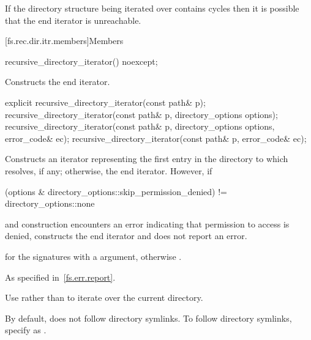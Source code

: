 \pnum
\begin{note}
If the directory structure being iterated over contains cycles
then it is possible that the end iterator is unreachable.
\end{note}

[fs.rec.dir.itr.members]{Members}

%
\begin{itemdecl}
recursive_directory_iterator() noexcept;
\end{itemdecl}

\begin{itemdescr}
\pnum
\effects
Constructs the end iterator.
\end{itemdescr}

%
\begin{itemdecl}
explicit recursive_directory_iterator(const path& p);
recursive_directory_iterator(const path& p, directory_options options);
recursive_directory_iterator(const path& p, directory_options options, error_code& ec);
recursive_directory_iterator(const path& p, error_code& ec);
\end{itemdecl}

\begin{itemdescr}
\pnum
\effects
Constructs an iterator representing the first
entry in the directory to which  resolves, if any; otherwise, the end iterator.
However, if
\begin{codeblock}
(options & directory_options::skip_permission_denied) != directory_options::none
\end{codeblock}
and construction encounters an error indicating
that permission to access  is denied, constructs the end iterator
and does not report an error.

\pnum
\ensures
{} for the signatures with a
 argument, otherwise .

\pnum
\throws
As specified in~\ref{fs.err.report}.

\pnum
\begin{note}
Use 
rather than 
to iterate over the current directory.
\end{note}

\pnum
\begin{note}
By default,  does not
follow directory symlinks. To follow directory symlinks, specify  as
.
\end{note}
\end{itemdescr}

